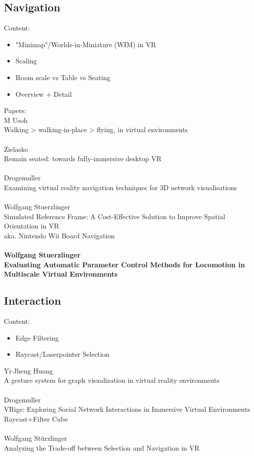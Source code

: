 \subsection{Navigation}
Content:
\begin{itemize}
    \item "Minimap"/Worlds-in-Miniature (WIM) in VR
    \item Scaling
    \item Room scale vs Table vs Seating
    \item Overview + Detail 
\end{itemize}

Papers: \\

M Usoh\\
Walking > walking-in-place > flying, in virtual environments\\
\\
Zielasko\\
Remain seated: towards fully-immersive desktop VR\\
\\
Drogemuller\\
Examining virtual reality navigation techniques for 3D network visualisations\\
\\
Wolfgang Stuerzlinger\\
Simulated Reference Frame: A Cost-Effective Solution to Improve Spatial Orientation in VR\\
aka. Nintendo Wii Board Navigation\\
\\
\textbf{Wolfgang Stuerzlinger\\
Evaluating Automatic Parameter Control Methods for
Locomotion in Multiscale Virtual Environments\\}


\subsection{Interaction}
Content: 
\begin{itemize}
    \item Edge Filtering
    \item Raycast/Laserpointer Selection
\end{itemize}

Yi-Jheng Huang\\
A gesture system for graph visualization in virtual reality environments\\
\\
Drogemuller\\
VRige: Exploring Social Network Interactions in Immersive Virtual Environments\\
Raycast+Filter Cube\\
\\
Wolfgang Stürzlinger\\
Analyzing the Trade-off between Selection and Navigation in VR\\



